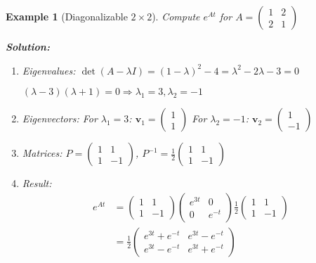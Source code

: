 \documentclass[12pt]{article}
\newtheorem{example}{Example}
\begin{document}
\begin{example}[Diagonalizable $2\times 2$]
Compute $e^{At}$ for $A = \begin{pmatrix} 1 & 2 \\ 2 & 1 \end{pmatrix}$

\textbf{Solution:}
\begin{enumerate}
\item Eigenvalues: $\det(A - \lambda I) = (1-\lambda)^{2} - 4 = \lambda^{2} - 2\lambda - 3 = 0$

$(\lambda - 3)(\lambda + 1) = 0 \Rightarrow \lambda_{1} = 3, \lambda_{2} = -1$

\item Eigenvectors:
For $\lambda_{1} = 3$: $\mathbf{v}_{1} = \begin{pmatrix} 1 \\ 1 \end{pmatrix}$
For $\lambda_{2} = -1$: $\mathbf{v}_{2} = \begin{pmatrix} 1 \\ -1 \end{pmatrix}$

\item Matrices:
$P = \begin{pmatrix} 1 & 1 \\ 1 & -1 \end{pmatrix}$, $P^{-1} = \frac{1}{2}\begin{pmatrix} 1 & 1 \\ 1 & -1 \end{pmatrix}$

\item Result:
\begin{align}
e^{At} &= \begin{pmatrix} 1 & 1 \\ 1 & -1 \end{pmatrix}\begin{pmatrix} e^{3t} & 0 \\ 0 & e^{-t} \end{pmatrix}\frac{1}{2}\begin{pmatrix} 1 & 1 \\ 1 & -1 \end{pmatrix} \\
&= \frac{1}{2}\begin{pmatrix} e^{3t} + e^{-t} & e^{3t} - e^{-t} \\ e^{3t} - e^{-t} & e^{3t} + e^{-t} \end{pmatrix}
\end{align}
\end{enumerate}
\end{example}
\end{document}
